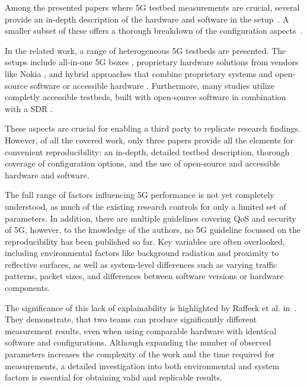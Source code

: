 \bigskip

Among the presented papers where 5G testbed measurements are crucial,
several provide an in-depth description of the hardware and software in the setup~\cite{diaz2020modular, raffeck2024parameterizing, 10439170, Mamushiane2023DeployingAS, mallikarjun2022performance, doria2024virtualized}.
A smaller subset of these offers a thorough breakdown of the configuration aspects~\cite{diaz2020modular, raffeck2024parameterizing, 10439170, doria2024virtualized}.

In the related work, a range of heterogeneous 5G testbeds are presented.
The setups include all-in-one 5G boxes \cite{Wang2021DevelopmentOA},
proprietary hardware solutions from vendors like Nokia \cite{diaz2020modular, mallikarjun2022performance},
and hybrid approaches that combine proprietary systems and open-source software or accessible hardware \cite{Rischke20215GCN, Rischke2022EmpiricalSO}.
Furthermore, many studies utilize completly accessible testbeds, built with open-source software in combination with a \gls{SDR} \cite{foukas2018experience, raffeck2024parameterizing,10439170,Mamushiane2023DeployingAS,mamushiane2023towards,seidel2024impact,doria2024virtualized,atalay2022scaling}.

These aspects are crucial for enabling a third party to replicate research findings.
However, of all the covered work, only three papers \cite{raffeck2024parameterizing,10439170,doria2024virtualized}
provide all the elements for convenient reproducibility: an in-depth, detailed testbed description,
thorough coverage of configuration options, and the use of open-source and accessible hardware and software.

The full range of factors influencing 5G performance is not yet completely understood,
as much of the existing research controls for only a limited set of parameters.
{In addition, there are multiple guidelines covering QoS and security of 5G, however, to the knowledge of the authors,
no 5G guideline focussed on the reproducibility has been published so far.}
Key variables are often overlooked, including environmental factors like background radiation and proximity
to reflective surfaces, as well as system-level differences such as varying traffic patterns, packet sizes, and differences between software versions or hardware components.


The significance of this lack of explainability is highlighted by Raffeck et al. in~\cite{raffeck2024parameterizing}.
They demonstrate, that two teams can produce significantly different measurement results, even when using comparable hardware with identical software and configurations.
Although expanding the number of observed parameters increases the complexity of the work and the time required for measurements,
a detailed investigation into both environmental and system factors is essential for obtaining valid and replicable results.

